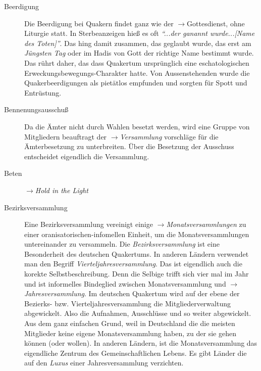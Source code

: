 \begin{description}
 \item[Beerdigung] Die Beerdigung bei Quakern findet ganz wie der
$\to$Gottesdienst, ohne Liturgie statt. In Sterbeanzeigen hieß es oft
\textit{"`...der ganannt wurde...[Name des Toten]"'}. Das hing damit zusammen,
das geglaubt wurde, das erst am \textit{Jüngsten Tag} oder im Hadis von Gott der
richtige Name bestimmt wurde. Das rührt daher, das dass Quakertum ursprünglich
eine eschatologischen Erweckungsbewegungs-Charakter hatte. Von Aussenstehenden
wurde die Quakerbeerdigungen als pietätlos empfunden und sorgten für Spott und
Entrüstung.  

 \item[Bennenungsausschuß] Da die Ämter nicht durch Wahlen besetzt werden, wird
eine Gruppe von Mitgliedern beauftragt der $\to$\textit{Versammlung} vorschläge
für die Ämterbesetzung zu unterbreiten. Über die Besetzung der Ausschuss
entscheidet eigendlich die Versammlung. 

 \item[Beten] $\to$\textit{Hold in the Light}
 
 \item[Bezirksversammlung] Eine Bezirksversammlung vereinigt einige
$\to$\textit{Monatsversammlungen} zu einer oranisatorischen-infomellen Einheit,
um die Monatsversammlungen untereinander zu versammeln. Die
\textit{Bezirksversammlung} ist eine Besonderheit des deutschen Quakertums. In
anderen Ländern verwendet man den Begriff \textit{Vierteljahresversammlung}. Das
ist eigendlich auch die korekte Selbstbeschreibung. Denn die Selbige trifft sich
vier mal im Jahr und ist informelles Bindeglied zwischen Monatsversammlung und
$\to$\textit{Jahresversammlung}. Im deutschen Quakertum wird auf der ebene der
Bezierks- bzw. Vierteljahresversammlung die Mitgliederverwaltung abgewickelt.
Also die Aufnahmen, Ausschlüsse und so weiter abgewickelt. Aus dem ganz
einfachen Grund, weil in Deutschland die die meisten Mitglieder keine eigene
Monatsversammlung haben, zu der sie gehen können (oder wollen). In anderen
Ländern, ist die Monatsversammlung das eigendliche Zentrum des
Gemeinschaftlichen Lebens. Es gibt Länder die auf den \textit{Luxus} einer
Jahresversammlung verzichten.
 

\end{description}
